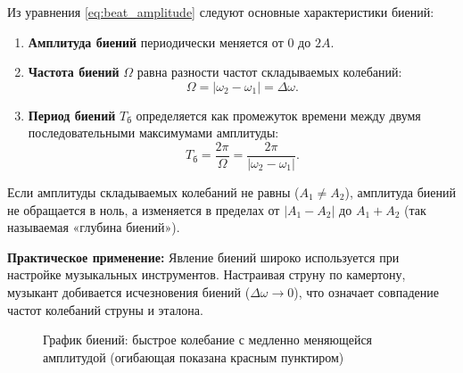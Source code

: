 \begin{property}
Из уравнения \eqref{eq:beat_amplitude} следуют основные характеристики биений:
\begin{enumerate}
    \item \textbf{Амплитуда биений} периодически меняется от $0$ до $2A$.
    \item \textbf{Частота биений} $\Omega$ равна разности частот складываемых колебаний:
    \begin{equation}
        \Omega = |\omega_2 - \omega_1| = \Delta\omega. \label{eq:beat_freq}
    \end{equation}
    \item \textbf{Период биений} $T_{\text{б}}$ определяется как промежуток времени между двумя последовательными максимумами амплитуды:
    \begin{equation}
        T_{\text{б}} = \frac{2\pi}{\Omega} = \frac{2\pi}{|\omega_2 - \omega_1|}. \label{eq:beat_period}
    \end{equation}
\end{enumerate}
\end{property}

\begin{remark}
Если амплитуды складываемых колебаний не равны ($A_1 \neq A_2$), амплитуда биений не обращается в ноль, а изменяется в пределах от $|A_1 - A_2|$ до $A_1 + A_2$ (так называемая «глубина биений»).
\par\noindent\textbf{Практическое применение:} Явление биений широко используется при настройке музыкальных инструментов. Настраивая струну по камертону, музыкант добивается исчезновения биений ($\Delta\omega \to 0$), что означает совпадение частот колебаний струны и эталона.
\end{remark}

\vspace{1cm}


\begin{figure}[htbp]
    \centering
    \caption{График биений: быстрое колебание с медленно меняющейся амплитудой (огибающая показана красным пунктиром)}
    \label{fig:beats_graph}
\end{figure}

